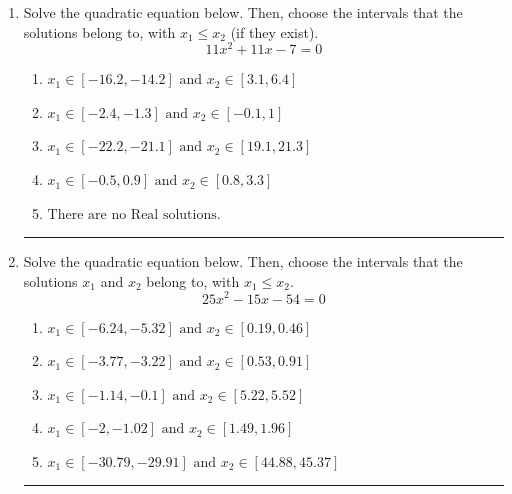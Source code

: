 \documentclass[14pt]{extbook}
\newcommand{\litem}[1]{\item#1\hspace*{-1cm}\rule{\textwidth}{0.4pt}}
\begin{document}
\begin{enumerate}
\litem{
Solve the quadratic equation below. Then, choose the intervals that the solutions belong to, with $x_1 \leq x_2$ (if they exist).\[ 11x^{2} +11 x -7 = 0 \]\begin{enumerate}[label=\Alph*.]
\item \( x_1 \in [-16.2, -14.2] \text{ and } x_2 \in [3.1, 6.4] \)
\item \( x_1 \in [-2.4, -1.3] \text{ and } x_2 \in [-0.1, 1] \)
\item \( x_1 \in [-22.2, -21.1] \text{ and } x_2 \in [19.1, 21.3] \)
\item \( x_1 \in [-0.5, 0.9] \text{ and } x_2 \in [0.8, 3.3] \)
\item \( \text{There are no Real solutions.} \)

\end{enumerate} }
\litem{
Solve the quadratic equation below. Then, choose the intervals that the solutions $x_1$ and $x_2$ belong to, with $x_1 \leq x_2$.\[ 25x^{2} -15 x -54 = 0 \]\begin{enumerate}[label=\Alph*.]
\item \( x_1 \in [-6.24, -5.32] \text{ and } x_2 \in [0.19, 0.46] \)
\item \( x_1 \in [-3.77, -3.22] \text{ and } x_2 \in [0.53, 0.91] \)
\item \( x_1 \in [-1.14, -0.1] \text{ and } x_2 \in [5.22, 5.52] \)
\item \( x_1 \in [-2, -1.02] \text{ and } x_2 \in [1.49, 1.96] \)
\item \( x_1 \in [-30.79, -29.91] \text{ and } x_2 \in [44.88, 45.37] \)


\end{enumerate}}
\end{enumerate}
\end{document}
